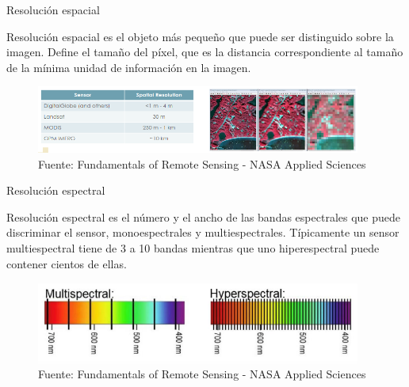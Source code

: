 \begin{frame}{Resolución espacial}
  \begin{block}{Resolución espacial}
    es el objeto más pequeño que puede ser distinguido sobre la imagen. Define el tamaño del píxel, que es la distancia correspondiente al tamaño de la mínima unidad de información en la imagen.
  \end{block}

  \begin{figure}
    \begin{center}
      \includegraphics[width=0.95\textwidth]{img/section_03/resolucion_espacial}
    \end{center}
    \caption{Fuente: Fundamentals of Remote Sensing - NASA Applied Sciences}
    \label{fig:resolucion_multiespectral_vs_hiperespectral}
  \end{figure}
\end{frame}

\begin{frame}{Resolución espectral}
  \begin{block}{Resolución espectral}
    es el número y el ancho de las bandas espectrales que puede discriminar el sensor, monoespectrales y multiespectrales. Típicamente un sensor multiespectral tiene de 3 a 10 bandas mientras que uno hiperespectral puede contener cientos de ellas.
  \end{block}

  \begin{figure}
    \begin{center}
      \includegraphics[width=0.95\textwidth]{img/section_03/resolucion_espectral}
    \end{center}
    \caption{Fuente: Fundamentals of Remote Sensing - NASA Applied Sciences}
    \label{fig:resolucion_espectral}
  \end{figure}
  
\end{frame}

